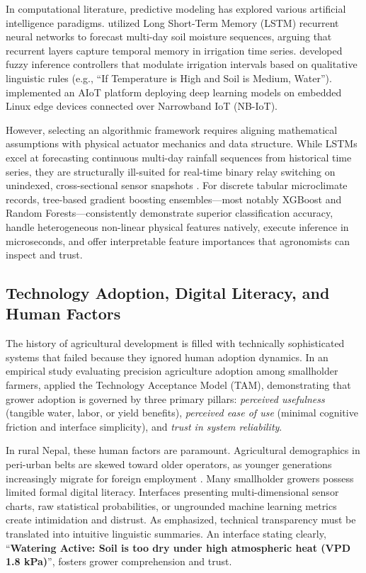 \documentclass[12pt, a4paper]{article}
\begin{document}
In computational literature, predictive modeling has explored various artificial intelligence paradigms. \citet{meng2023} utilized Long Short-Term Memory (LSTM) recurrent neural networks to forecast multi-day soil moisture sequences, arguing that recurrent layers capture temporal memory in irrigation time series. \citet{tang2023} developed fuzzy inference controllers that modulate irrigation intervals based on qualitative linguistic rules (e.g., ``If Temperature is High and Soil is Medium, Water''). \citet{li2022} implemented an AIoT platform deploying deep learning models on embedded Linux edge devices connected over Narrowband IoT (NB-IoT).

However, selecting an algorithmic framework requires aligning mathematical assumptions with physical actuator mechanics and data structure. While LSTMs excel at forecasting continuous multi-day rainfall sequences from historical time series, they are structurally ill-suited for real-time binary relay switching on unindexed, cross-sectional sensor snapshots \citep{chen2020xgboost}. For discrete tabular microclimate records, tree-based gradient boosting ensembles—most notably XGBoost \citep{chen2020xgboost} and Random Forests—consistently demonstrate superior classification accuracy, handle heterogeneous non-linear physical features natively, execute inference in microseconds, and offer interpretable feature importances that agronomists can inspect and trust.

\subsection{Technology Adoption, Digital Literacy, and Human Factors}
\label{sec:adoption}

The history of agricultural development is filled with technically sophisticated systems that failed because they ignored human adoption dynamics. In an empirical study evaluating precision agriculture adoption among smallholder farmers, \citet{zitan2021} applied the Technology Acceptance Model (TAM), demonstrating that grower adoption is governed by three primary pillars: \emph{perceived usefulness} (tangible water, labor, or yield benefits), \emph{perceived ease of use} (minimal cognitive friction and interface simplicity), and \emph{trust in system reliability}.

In rural Nepal, these human factors are paramount. Agricultural demographics in peri-urban belts are skewed toward older operators, as younger generations increasingly migrate for foreign employment \citep{upadhyay2015}. Many smallholder growers possess limited formal digital literacy. Interfaces presenting multi-dimensional sensor charts, raw statistical probabilities, or ungrounded machine learning metrics create intimidation and distrust. As \citet{zitan2021} emphasized, technical transparency must be translated into intuitive linguistic summaries. An interface stating clearly, ``\textbf{Watering Active: Soil is too dry under high atmospheric heat (VPD 1.8 kPa)}'', fosters grower comprehension and trust.
\end{document}
